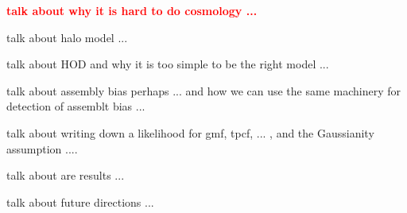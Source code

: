 \documentclass[12pt, preprint]{aastex}
\newcommand{\todo}[1]{{\bf \textcolor{red}{ #1}}}
\begin{document}
\todo{talk about why it is hard to do cosmology ...}

talk about halo model ...

talk about HOD and why it is too simple to be the right model ...

talk about assembly bias perhaps ... and how we can use the same machinery for detection of assemblt bias ... 

talk about writing down a likelihood for gmf, tpcf, ... , and the Gaussianity assumption ....

talk about are results ...


talk about future directions ...


\end{document}
